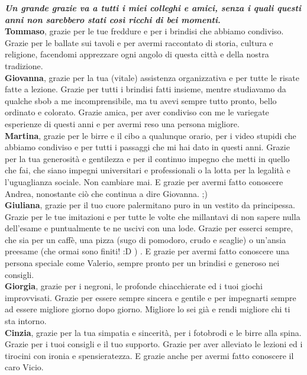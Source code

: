 \emph{\textbf{Un grande grazie va a tutti i miei colleghi e amici, senza i quali questi anni non sarebbero stati così ricchi di bei momenti.}}\\

\textbf{Tommaso}, grazie per le tue freddure e per i brindisi che abbiamo condiviso. Grazie per le ballate sui tavoli e per avermi raccontato di storia, cultura e religione, facendomi apprezzare ogni angolo di questa città e della nostra tradizione.\\

\textbf{Giovanna}, grazie per la tua (vitale) assistenza organizzativa e per tutte le risate fatte a lezione. Grazie per tutti i brindisi fatti insieme, mentre studiavamo da qualche sbob a me incomprensibile, ma tu avevi sempre tutto pronto, bello ordinato e colorato. Grazie amica, per aver condiviso con me le variegate esperienze di questi anni e per avermi reso una persona migliore.\\

\textbf{Martina}, grazie per le birre e il cibo a qualunque orario, per i video stupidi che abbiamo condiviso e per tutti i passaggi che mi hai dato in questi anni. Grazie per la tua generosità e gentilezza e per il continuo impegno che metti in quello che fai, che siano impegni universitari e professionali o la lotta per la legalità e l'uguaglianza sociale. Non cambiare mai. E grazie per avermi fatto conoscere Andrea, nonostante ciò che continua a dire Giovanna. ;)\\

\textbf{Giuliana}, grazie per il tuo cuore palermitano puro in un vestito da principessa. Grazie per le tue imitazioni e per tutte le volte che millantavi di non sapere nulla dell'esame e puntualmente te ne uscivi con una lode. Grazie per esserci sempre, che sia per un caffè, una pizza (sugo di pomodoro, crudo e scaglie) o un'ansia preesame (che ormai sono finiti! :D ) . E grazie per avermi fatto conoscere una persona speciale come Valerio, sempre pronto per un brindisi e generoso nei consigli.\\

\textbf{Giorgia}, grazie per i negroni, le profonde chiacchierate ed i tuoi giochi improvvisati. Grazie per essere sempre sincera e gentile e per impegnarti sempre ad essere migliore giorno dopo giorno. Migliore lo sei già e rendi migliore chi ti sta intorno.\\

\textbf{Cinzia}, grazie per la tua simpatia e sincerità, per i fotobrodi e le birre alla spina. Grazie per i tuoi consigli e il tuo supporto. Grazie per aver alleviato le lezioni ed i tirocini con ironia e spensieratezza. E grazie anche per avermi fatto conoscere il caro Vicio.\\

